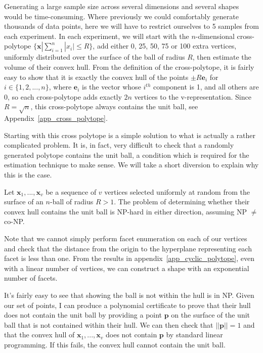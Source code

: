 Generating a large sample size across several dimensions and several shapes would be time-consuming. Where previously we could comfortably generate thousands of data points, here we will have to restrict ourselves to 5 samples from each experiment. In each experiment, we will start with the $n$-dimensional cross-polytope $\{{\bm x} | \sum^n_{i=1}|x_i| \leqslant R\}$, add either 0, 25, 50, 75 or 100 extra vertices, uniformly distributed over the surface of the ball of radius $R$, then estimate the volume of their convex hull. From the definition of the cross-polytope, it is fairly easy to show that it is exactly the convex hull of the points $\pm R{\bm e}_i$ for $i \in \{1,2,...,n\}$, where ${\bm e}_i$ is the vector whose $i^{th}$ component is 1, and all others are 0, so each cross-polytope adds exactly $2n$ vertices to the v-representation. Since $R=\sqrt{n}$, this cross-polytope always contains the unit ball, see Appendix~\ref{app_cross_polytope}. 

Starting with this cross polytope is a simple solution to what is actually a rather complicated problem. It is, in fact, very difficult to check that a randomly generated polytope contains the unit ball, a condition which is required for the estimation technique to make sense. We will take a short diversion to explain why this is the case.

\begin{proposition}
Let ${\bm x}_1, ..., {\bm x}_v$ be a sequence of $v$ vertices selected uniformly at random from the surface of an $n$-ball of radius $R>1$. The problem of determining whether their convex hull contains the unit ball is NP-hard in either direction, assuming NP $\neq$ co-NP.
\end{proposition}

Note that we cannot simply perform facet enumeration on each of our vertices and check that the distance from the origin to the hyperplane representing each facet is less than one. From the results in appendix~\ref{app_cyclic_polytope}, even with a linear number of vertices, we can construct a shape with an exponential number of facets.

It's fairly easy to see that showing the ball is not within the hull is in NP. Given our set of points, I can produce a polynomial certificate to prove that their hull does not contain the unit ball by providing a point $\bm p$ on the surface of the unit ball that is not contained within their hull. We can then check that $||\bm{p}|| = 1$ and that the convex hull of ${\bm x}_1, ..., {\bm x}_v$ does not contain $\bm p$ by standard linear programming. If this fails, the convex hull cannot contain the unit ball.

